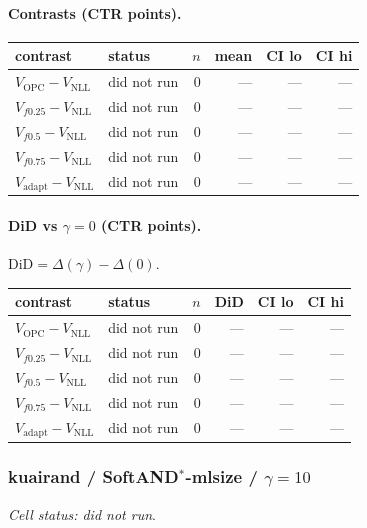 \documentclass[10pt,a4paper]{article}
\begin{document}
\paragraph{Contrasts (CTR points).}
{\centering\small\begin{tabular}{llrrrr}
\toprule contrast & status & $n$ & mean & CI lo & CI hi \\
\midrule
$V_{\mathrm{OPC}}-V_{\mathrm{NLL}}$ & did not run & 0 & --- & --- & --- \\
$V_{f0.25}-V_{\mathrm{NLL}}$ & did not run & 0 & --- & --- & --- \\
$V_{f0.5}-V_{\mathrm{NLL}}$ & did not run & 0 & --- & --- & --- \\
$V_{f0.75}-V_{\mathrm{NLL}}$ & did not run & 0 & --- & --- & --- \\
$V_{\mathrm{adapt}}-V_{\mathrm{NLL}}$ & did not run & 0 & --- & --- & --- \\
\bottomrule\end{tabular}\par}
\paragraph{DiD vs $\gamma=0$ (CTR points).} $\mathrm{DiD}=\Delta(\gamma)-\Delta(0)$.
{\centering\small\begin{tabular}{llrrrr}
\toprule contrast & status & $n$ & DiD & CI lo & CI hi \\
\midrule
$V_{\mathrm{OPC}}-V_{\mathrm{NLL}}$ & did not run & 0 & --- & --- & --- \\
$V_{f0.25}-V_{\mathrm{NLL}}$ & did not run & 0 & --- & --- & --- \\
$V_{f0.5}-V_{\mathrm{NLL}}$ & did not run & 0 & --- & --- & --- \\
$V_{f0.75}-V_{\mathrm{NLL}}$ & did not run & 0 & --- & --- & --- \\
$V_{\mathrm{adapt}}-V_{\mathrm{NLL}}$ & did not run & 0 & --- & --- & --- \\
\bottomrule\end{tabular}\par}
\bigskip
\subsubsection{kuairand / SoftAND$^*$-mlsize / $\gamma=10$}
\emph{Cell status: did not run}.
\end{document}
